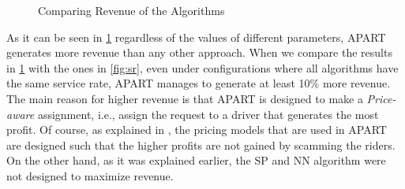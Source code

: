 \begin{figure}[h]
    \centering
    \vspace{-0.15in}
    \caption{Comparing Revenue of the Algorithms}
    \label{fig:rev}
\end{figure}

As it can be seen in \cref{fig:rev} regardless of the values of different parameters, APART generates more revenue than any other approach. When we compare the results in \cref{fig:rev} with the ones in \cref{fig:sr}, even under configurations where all algorithms have the same service rate, APART manages to generate at least 10\% more revenue. The main reason for higher revenue is that APART is designed to make a \textit{Price-aware} assignment, i.e., assign the request to a driver that generates the most profit. Of course, as explained in , the pricing models that are used in APART are designed such that the higher profits are not gained by scamming the riders. On the other hand, as it was explained earlier, the SP and NN algorithm were not designed to maximize revenue.

